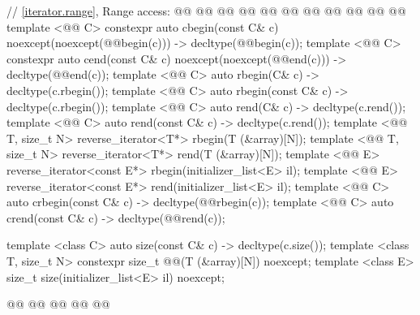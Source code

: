 \begin{codeblock}
  // \ref{iterator.range}, Range access:
  @@
  @@
  @@
  @@
  @@
  @@
  @@
  @@
  @\newtxt{// \expos}@
  @@
    @@
  template <@@ C> constexpr auto cbegin(const C& c) noexcept(noexcept(@@begin(c)))
    -> decltype(@@begin(c));
  template <@@ C> constexpr auto cend(const C& c) noexcept(noexcept(@@end(c)))
    -> decltype(@@end(c));
  template <@@ C> auto rbegin(C& c) -> decltype(c.rbegin());
  template <@@ C> auto rbegin(const C& c) -> decltype(c.rbegin());
  template <@@ C> auto rend(C& c) -> decltype(c.rend());
  template <@@ C> auto rend(const C& c) -> decltype(c.rend());
  template <@@ T, size_t N> reverse_iterator<T*> rbegin(T (&array)[N]);
  template <@@ T, size_t N> reverse_iterator<T*> rend(T (&array)[N]);
  template <@@ E> reverse_iterator<const E*> rbegin(initializer_list<E> il);
  template <@@ E> reverse_iterator<const E*> rend(initializer_list<E> il);
  template <@@ C> auto crbegin(const C& c) -> decltype(@@rbegin(c));
  template <@@ C> auto crend(const C& c) -> decltype(@@rend(c));
\end{codeblock}
\begin{addedblock}
\begin{codeblock}
  template <class C> auto size(const C& c) -> decltype(c.size());
  template <class T, size_t N> constexpr size_t @@(T (&array)[N]) noexcept;
  template <class E> size_t size(initializer_list<E> il) noexcept;

  @@
  @@
  @@
  @@
  @@
\end{codeblock}
\end{addedblock}
\begin{codeblock}
}@\newtxt{\}\}}@
\end{codeblock}

